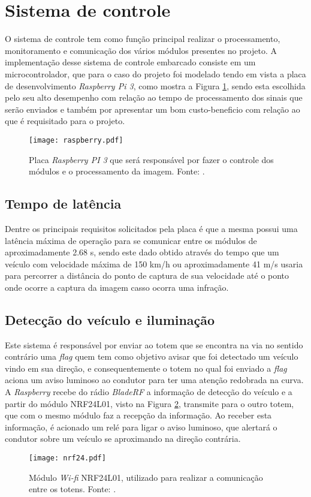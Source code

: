 \section{Sistema de controle}
    O sistema de controle tem como função principal realizar o processamento, monitoramento e comunicação dos vários módulos presentes no projeto. A implementação desse sistema de controle embarcado consiste em um microcontrolador, que para o caso do projeto foi modelado tendo em vista a placa de desenvolvimento \emph{Raspberry Pi 3}, como mostra a Figura \ref{raspberry}, sendo esta escolhida pelo seu alto desempenho com relação ao tempo de processamento dos sinais que serão enviados e também por apresentar um bom custo-beneficio com relação ao que é requisitado para o projeto. 
    \begin{figure}[H]
    \centering
   \texttt{[image: raspberry.pdf]}
   \caption{Placa \emph{Raspberry PI 3} que será responsável por fazer o controle dos módulos e o processamento da imagem. Fonte: \cite{rasp}.}
   \label{raspberry}
    \end{figure}
    \subsection{Tempo de latência}
    Dentre os principais requisitos solicitados pela placa é que a mesma possui uma latência máxima de operação para se comunicar entre os módulos de aproximadamente 2.68 s, sendo este dado obtido através do tempo que um veículo com velocidade máxima de 150 km/h ou aproximadamente 41 m/s usaria para percorrer a distância do ponto de captura de sua velocidade até o ponto onde ocorre a captura da imagem casso ocorra uma infração. 
    \subsection{Detecção do veículo e iluminação}
    Este sistema é responsável por enviar ao totem que se encontra na via no sentido contrário uma \emph{flag} quem tem como objetivo avisar que foi detectado um veículo vindo em sua direção, e consequentemente o totem no qual foi enviado a \emph{flag} aciona um aviso luminoso ao condutor para ter uma atenção redobrada na curva. A \emph{Raspberry} recebe do rádio \emph{BladeRF} a informação de detecção do veículo e a partir do módulo NRF24L01, visto na Figura \ref{nrf24}, transmite para o outro totem, que com o mesmo módulo faz a recepção da informação. Ao receber esta informação, é acionado um relé para ligar o aviso luminoso, que alertará o condutor sobre um veículo se aproximando na direção contrária.  
    \begin{figure}[H]
    \centering
    \texttt{[image: nrf24.pdf]}
    \caption{Módulo \emph{Wi-fi} NRF24L01, utilizado para realizar a comunicação entre os totens. Fonte: \cite{NRF}.}
    \label{nrf24}
\end{figure}
